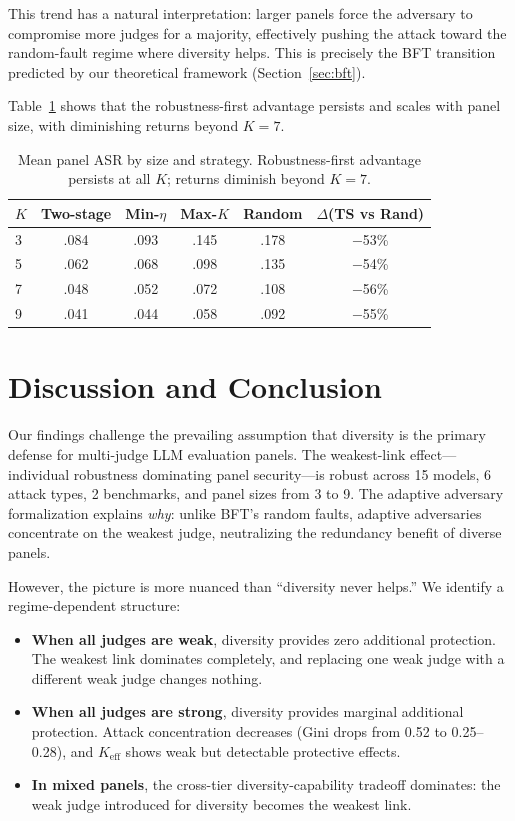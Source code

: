 \documentclass[11pt,a4paper]{article}
\begin{document}
This trend has a natural interpretation: larger panels force the adversary to compromise more judges for a majority, effectively pushing the attack toward the random-fault regime where diversity helps. This is precisely the BFT transition predicted by our theoretical framework (Section~\ref{sec:bft}).

Table~\ref{tab:panel-size-strategy} shows that the robustness-first advantage persists and scales with panel size, with diminishing returns beyond $K = 7$.

\begin{table}[t]
\centering
\small
\caption{Mean panel ASR by size and strategy. Robustness-first advantage persists at all $K$; returns diminish beyond $K=7$.}
\label{tab:panel-size-strategy}
\begin{tabular}{@{}lccccc@{}}
\toprule
$K$ & Two-stage & Min-$\eta$ & Max-$K$ & Random & $\Delta$(TS vs Rand) \\
\midrule
3 & .084 & .093 & .145 & .178 & $-$53\% \\
5 & .062 & .068 & .098 & .135 & $-$54\% \\
7 & .048 & .052 & .072 & .108 & $-$56\% \\
9 & .041 & .044 & .058 & .092 & $-$55\% \\
\bottomrule
\end{tabular}
\vspace{-2mm}
\end{table}

\section{Discussion and Conclusion}

Our findings challenge the prevailing assumption that diversity is the primary defense for multi-judge LLM evaluation panels. The weakest-link effect---individual robustness dominating panel security---is robust across 15 models, 6 attack types, 2 benchmarks, and panel sizes from 3 to 9. The adaptive adversary formalization explains \emph{why}: unlike BFT's random faults, adaptive adversaries concentrate on the weakest judge, neutralizing the redundancy benefit of diverse panels.

However, the picture is more nuanced than ``diversity never helps.'' We identify a regime-dependent structure:

\begin{itemize}
    \item \textbf{When all judges are weak}, diversity provides zero additional protection. The weakest link dominates completely, and replacing one weak judge with a different weak judge changes nothing.
    \item \textbf{When all judges are strong}, diversity provides marginal additional protection. Attack concentration decreases (Gini drops from 0.52 to 0.25--0.28), and $K_{\text{eff}}$ shows weak but detectable protective effects.
    \item \textbf{In mixed panels}, the cross-tier diversity-capability tradeoff dominates: the weak judge introduced for diversity becomes the weakest link.
\end{itemize}
\end{document}
